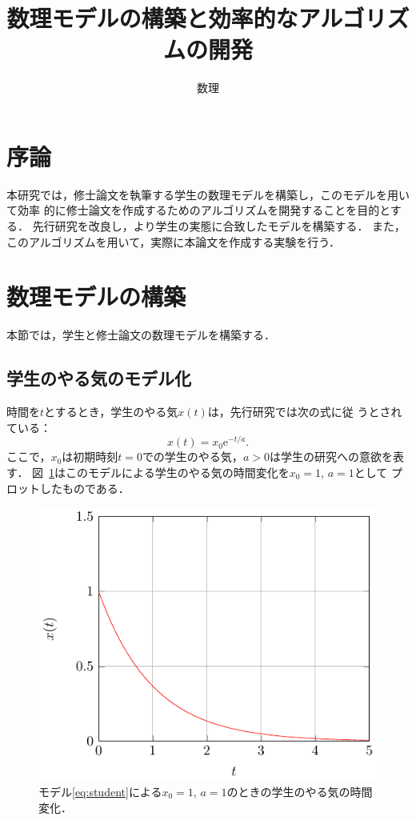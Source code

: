\documentclass[dvipdfmx]{ampmt}
\title{数理モデルの構築と効率的なアルゴリズムの開発} %
      {}                                             %
      {}                                             %
\author{数理}{三郎}             %
\newcommand{\rme}{\mathrm{e}}
\begin{document}
\ifoutputbody
\makeinsidecover                %
\makeabstract                   %
\maketoc                        %
\setcounter{page}{1}            %
\section{序論}
本研究では，修士論文を執筆する学生の数理モデルを構築し，このモデルを用いて効率
的に修士論文を作成するためのアルゴリズムを開発することを目的とする．
先行研究\cite{suuri2010}を改良し，より学生の実態に合致したモデルを構築する．
また，このアルゴリズムを用いて，実際に本論文を作成する実験を行う．

\section{数理モデルの構築}
本節では，学生と修士論文の数理モデルを構築する．

\subsection{学生のやる気のモデル化}
時間を$t$とするとき，学生のやる気$x(t)$は，先行研究\cite{suuri2010}では次の式に従
うとされている：
\begin{equation}\label{eq:student}
  x(t)=x_0 \rme^{-t/a}.
\end{equation}
ここで，$x_0$は初期時刻$t=0$での学生のやる気，$a>0$は学生の研究への意欲を表す．
図~\ref{fig:student}はこのモデルによる学生のやる気の時間変化を$x_0=1$, $a=1$として
プロットしたものである．
\begin{figure}[htbp]
  \centering
  \includegraphics{ampmt_figure.pdf}
  \caption{モデル\eqref{eq:student}による$x_0=1$, $a=1$のときの学生のやる気の時間
    変化．}
  \label{fig:student}
\end{figure}
\end{document}

